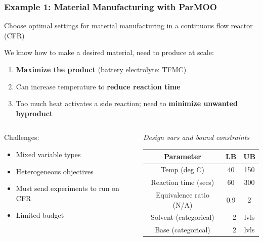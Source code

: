 \documentclass[aspectratio=169]{beamer}
\begin{document}
\begin{frame}\frametitle{Example 1: Material Manufacturing with ParMOO}
Choose optimal settings for material manufacturing in a
continuous flow reactor (CFR)

\bigskip

We know how to make a desired material, need to produce at scale:

\begin{enumerate}
\item {\color{green} \bf Maximize the product} (battery electrolyte: TFMC)
\item Can increase temperature to {\bf \color{red} reduce reaction time}
\item Too much heat activates a side reaction; need to
{\bf \color{blue} minimize unwanted byproduct}
\end{enumerate}

\bigskip
\begin{columns}
\begin{column}{0.5\textwidth}
Challenges:

\begin{itemize}
\item Mixed variable types
\item Heterogeneous objectives
\item Must send experiments to run on CFR
\item Limited budget
\end{itemize}
\end{column}
\begin{column}{0.5\textwidth}
  {\small
  {\sl Design vars and bound constraints}

  \smallskip

      \begin{tabular}{c|cc}
      Parameter & LB & UB \\
      \hline
       Temp (deg C) & 40 & 150 \\
       Reaction time (secs) & 60 & 300 \\
       Equivalence ratio (N/A) & 0.9 & 2 \\
      \hline
       Solvent (categorical) & $\quad$2 & lvls \\
       Base (categorical) & $\quad$2 & lvls \\
  \end{tabular}
  }
\end{column}
\end{columns}
\end{frame}
\end{document}
